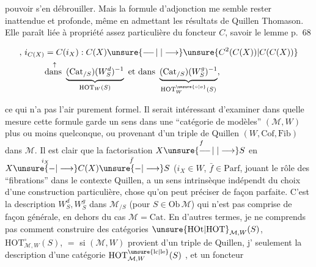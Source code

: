 
pouvoir s'en débrouiller. Mais la formule d'adjonction me semble rester inattendue et profonde, même en admettant les résultats de Quillen  Thomason. Elle paraît liée  à  propriété assez particulière du foncteur $C$, savoir le lemme p.~68


\[
\begin{aligned}
,\,i_{C(X)}&=C(i_X):C(X)\unsure{\mathrel{\relbar\joinrel\relbar\joinrel\vert}|\longrightarrow}\unsure{C^2(C(X))|C(C(X))}\\
&\overset{\uparrow}{\text{dans }}\underbrace{(\mathrm{Cat}_{/S})(W_S^d)^{-1}}_{\mathrm{HOT}_W(S)}
 \text{ et dans }\underbrace{(\mathrm{Cat}_{/S})(W_S^g)^{-1}}_{\mathrm{HOT}_W^{\unsure{\circ|o}}(S)},
\end{aligned}
\]

ce qui n'a pas l'air purement formel.  Il serait intéressant d'examiner dans quelle mesure   cette formule garde un sens  dans une ``catégorie de modèles'' $(\mathcal M,W)$ plus ou moins quelconque,  ou provenant d'un triple de Quillen $(W,\mathrm{Cof},\mathrm{Fib})$ dans $\mathcal M$. Il est clair que la factorisation $X\overset{f}{\unsure{\mathrel{\relbar\joinrel\relbar\joinrel\vert}|\longrightarrow}}S$ en $X\overset{i_X}{\unsure{-|\longrightarrow}}C(X)\overset{\bar f}{\unsure{-|\longrightarrow}}S$ ($i_X\in W$, $\bar f\in\mathrm{Parf}$, jouant le rôle des ``fibrations'' dans le contexte Quillen, a un sens intrinsèque indépendt du choix d'une construction particulière, chose qu'on peut préciser de façon parfaite. C'est la  description  $W_S^d,W_S^g$ dans $\mathcal M_{/S}$ (pour $S\in\mathrm{Ob}\,\mathcal M$) qui n'est pas comprise de façon générale, en dehors du cas $\mathcal M=\mathrm{Cat}$. En d'autres termes, je ne comprends pas comment construire des catégories $\mathrm{\unsure{HOt|HOT}}_{\mathcal M,W}(S)$, $\mathrm{HOT}_{\mathcal M,W}^{\circ}(S)$, $=$ si $(\mathcal M,W)$ provient d'un triple de Quillen, j'  seulement la description d'une catégorie $\mathrm{HOT}^{\unsure{\mathrm{lc}|\mathrm{le}}}_{\mathcal M,W}(S)$ , et un foncteur 

